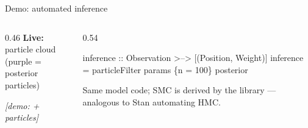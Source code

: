 \begin{frame}[fragile]{Demo: automated inference}
  \begin{columns}[T]
    \begin{column}{0.46\textwidth}
      \textbf{Live:} particle cloud\\[0.3em]
      {\small (purple = posterior particles)}
      \vspace{1.2em}

      {\scriptsize\textit{[demo: + particles]}}
    \end{column}
    \begin{column}{0.54\textwidth}
\begin{semiverbatim}
inference :: Observation
          >--> [(Position, Weight)]
inference =
  particleFilter params \{n = 100\}
    posterior
\end{semiverbatim}
      \vspace{0.6em}
      {\small Same model code; SMC is derived by the library ---\\
      analogous to Stan automating HMC.}
    \end{column}
  \end{columns}
\end{frame}
